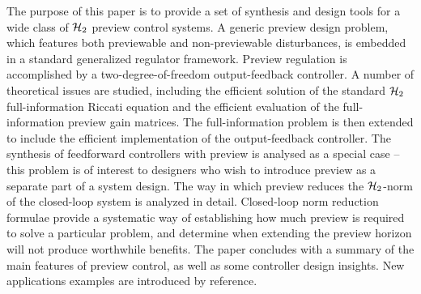 \label{sec:Abstract}
The purpose of this paper is to provide a set of synthesis and design tools for a wide class of $\mathcal H_2$ preview control systems. A generic preview design problem, which features both previewable and non-previewable disturbances,  is embedded in a standard generalized regulator framework. Preview regulation is accomplished by a two-degree-of-freedom output-feedback controller. A number of theoretical issues are studied, including the efficient solution of the standard $\mathcal H_2$ full-information Riccati equation and the efficient evaluation of the full-information preview gain matrices. The full-information problem is then extended to include the efficient implementation of the output-feedback controller. The synthesis of feedforward controllers with preview is analysed as a special case -- this problem is of interest to designers who wish to introduce preview as a separate part of a system design. The way in which preview reduces the $\mathcal H_2$-norm of the closed-loop system is analyzed in detail. Closed-loop norm reduction formulae provide a systematic way of establishing how much preview is required to solve a particular problem, and determine when extending the preview horizon will not produce worthwhile benefits. The paper concludes with a summary of the main features of preview control, as well as some controller design insights. New applications examples are introduced by reference. 